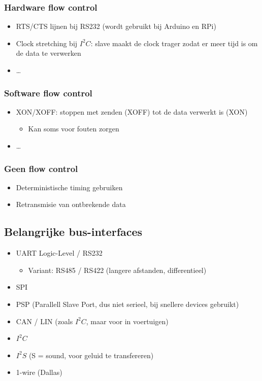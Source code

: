 \documentclass{article}
\begin{document}
\subsubsection{Hardware flow control}
\begin{itemize}
    \item RTS/CTS lijnen bij RS232 (wordt gebruikt bij Arduino en RPi)
    \item Clock stretching bij $I^2C$: slave maakt de clock trager zodat er meer tijd is om de data te verwerken
    \item \dots
\end{itemize}

\subsubsection{Software flow control}
\begin{itemize}
    \item XON/XOFF: stoppen met zenden (XOFF) tot de data verwerkt is (XON)
    \begin{itemize}
        \item Kan soms voor fouten zorgen
    \end{itemize}
    \item \dots
\end{itemize}

\subsubsection{Geen flow control}
\begin{itemize}
    \item Deterministische timing gebruiken
    \item Retransmisie van ontbrekende data
\end{itemize}

\subsection{Belangrijke bus-interfaces}
\begin{itemize}
    \item UART Logic-Level / RS232
    \begin{itemize}
        \item Variant: RS485 / RS422 (langere afstanden, differentieel)
    \end{itemize} 
    \item SPI
    \item PSP (Parallell Slave Port, dus niet serieel, bij snellere devices gebruikt)
    \item CAN / LIN (zoals $I^2C$, maar voor in voertuigen)
    \item $I^2C$
    \item $I^2S$ (S = sound, voor geluid te transfereren)
    \item 1-wire (Dallas)
\end{itemize}
\end{document}
